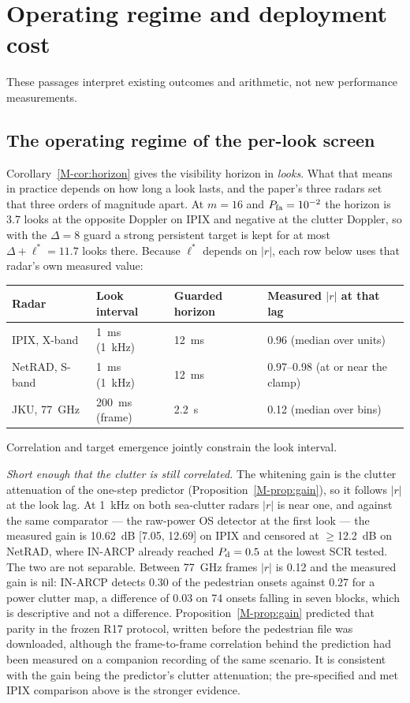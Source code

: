 \documentclass[10pt]{article}
\begin{document}
\section{Operating regime and deployment cost}\label{sup:r18}
These passages interpret existing outcomes and arithmetic, not new performance measurements.

\subsection{The operating regime of the per-look screen}\label{sup:regime}
Corollary~\ref{M-cor:horizon} gives the visibility horizon in \emph{looks}. What that means in
practice depends on how long a look lasts, and the paper's three radars set that three orders
of magnitude apart. At $m=16$ and $P_{\rm fa}=10^{-2}$ the horizon is
3.7 looks at the opposite Doppler on IPIX and negative at the clutter Doppler, so with
the $\Delta=8$ guard a strong persistent target is kept for at most
$\Delta+\ell^{\ast}=11.7$ looks there. Because $\ell^{\ast}$ depends on $|r|$, each
row below uses that radar's own measured value:

\begin{center}\small
\begin{tabular}{llll}
\toprule
Radar & Look interval & Guarded horizon & Measured $|r|$ at that lag\\
\midrule
IPIX, X-band & 1~ms (1~kHz) & 12~ms & 0.96 (median over units)\\
NetRAD, S-band & 1~ms (1~kHz) & 12~ms & 0.97--0.98 (at or near the clamp)\\
JKU, 77~GHz & 200~ms (frame) & 2.2~s & 0.12 (median over bins)\\
\bottomrule
\end{tabular}
\end{center}

\noindent Correlation and target emergence jointly constrain the look interval.

\emph{Short enough that the clutter is still correlated.} The whitening gain is the clutter
attenuation of the one-step predictor (Proposition~\ref{M-prop:gain}), so it follows $|r|$ at
the look lag. At 1~kHz on both sea-clutter radars $|r|$ is near one, and against the same
comparator --- the raw-power OS detector at the first look --- the measured gain is 10.62~dB
[7.05, 12.69] on IPIX and censored at $\ge$12.2~dB on NetRAD, where IN-ARCP already reached
$P_{\rm d}=0.5$ at the lowest SCR tested. The two are not separable. Between 77~GHz frames
$|r|$ is 0.12 and the measured gain is nil: IN-ARCP detects 0.30 of the pedestrian onsets
against 0.27 for a power clutter map, a difference of 0.03 on 74 onsets falling in seven
blocks, which is descriptive and not a difference. Proposition~\ref{M-prop:gain} predicted
that parity in the frozen R17 protocol, written before the pedestrian file was downloaded,
although the frame-to-frame correlation behind the prediction had been measured on a companion
recording of the same scenario. It is consistent with the gain being the predictor's clutter
attenuation; the pre-specified and met IPIX comparison above is the stronger evidence.
\end{document}

